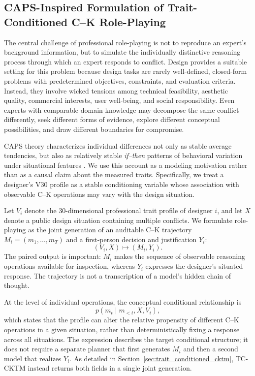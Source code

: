 \subsection{CAPS-Inspired Formulation of Trait-Conditioned C--K Role-Playing}
\label{sec:caps_formulation}

The central challenge of professional role-playing is not to reproduce an expert's background information, but to simulate the individually distinctive reasoning process through which an expert responds to conflict. Design provides a suitable setting for this problem because design tasks are rarely well-defined, closed-form problems with predetermined objectives, constraints, and evaluation criteria. Instead, they involve wicked tensions among technical feasibility, aesthetic quality, commercial interests, user well-being, and social responsibility. Even experts with comparable domain knowledge may decompose the same conflict differently, seek different forms of evidence, explore different conceptual possibilities, and draw different boundaries for compromise.

CAPS theory characterizes individual differences not only as stable average tendencies, but also as relatively stable \emph{if--then} patterns of behavioral variation under situational features \citep{mischel1995cognitive}. We use this account as a modeling motivation rather than as a causal claim about the measured traits. Specifically, we treat a designer's V30 profile as a stable conditioning variable whose association with observable C--K operations may vary with the design situation.

Let $V_i$ denote the 30-dimensional professional trait profile of designer $i$, and let $X$ denote a public design situation containing multiple conflicts. We formulate role-playing as the joint generation of an auditable C--K trajectory $M_i=(m_1,\ldots,m_T)$ and a first-person decision and justification $Y_i$:
\begin{equation}
    (V_i,X) \mapsto (M_i,Y_i).
    \label{eq:roleplay_formulation}
\end{equation}
The paired output is important: $M_i$ makes the sequence of observable reasoning operations available for inspection, whereas $Y_i$ expresses the designer's situated response. The trajectory is not a transcription of a model's hidden chain of thought.

At the level of individual operations, the conceptual conditional relationship is
\begin{equation}
    p(m_t \mid m_{<t},X,V_i),
    \label{eq:trait_conditioned_transition}
\end{equation}
which states that the profile can alter the relative propensity of different C--K operations in a given situation, rather than deterministically fixing a response across all situations. The expression describes the target conditional structure; it does not require a separate planner that first generates $M_i$ and then a second model that realizes $Y_i$. As detailed in Section~\ref{sec:trait_conditioned_cktm}, TC-CKTM instead returns both fields in a single joint generation.

